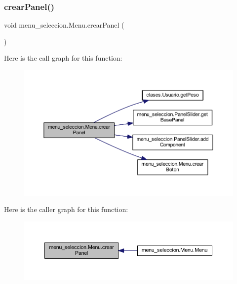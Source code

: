 \subsubsection{\texorpdfstring{crear\+Panel()}{crearPanel()}}
{\footnotesize\ttfamily void menu\+\_\+seleccion.\+Menu.\+crear\+Panel (\begin{DoxyParamCaption}{ }\end{DoxyParamCaption})}

Here is the call graph for this function\+:
\nopagebreak
\begin{figure}[H]
\begin{center}
\leavevmode
\includegraphics[width=350pt]{classmenu__seleccion_1_1_menu_a0c343de6099f0b63a85771456a59782f_cgraph}
\end{center}
\end{figure}
Here is the caller graph for this function\+:
\nopagebreak
\begin{figure}[H]
\begin{center}
\leavevmode
\includegraphics[width=350pt]{classmenu__seleccion_1_1_menu_a0c343de6099f0b63a85771456a59782f_icgraph}
\end{center}
\end{figure}
\mbox{\label{classmenu__seleccion_1_1_menu_ad439936756fbce3bc0128bc33b3f80b3}} 
